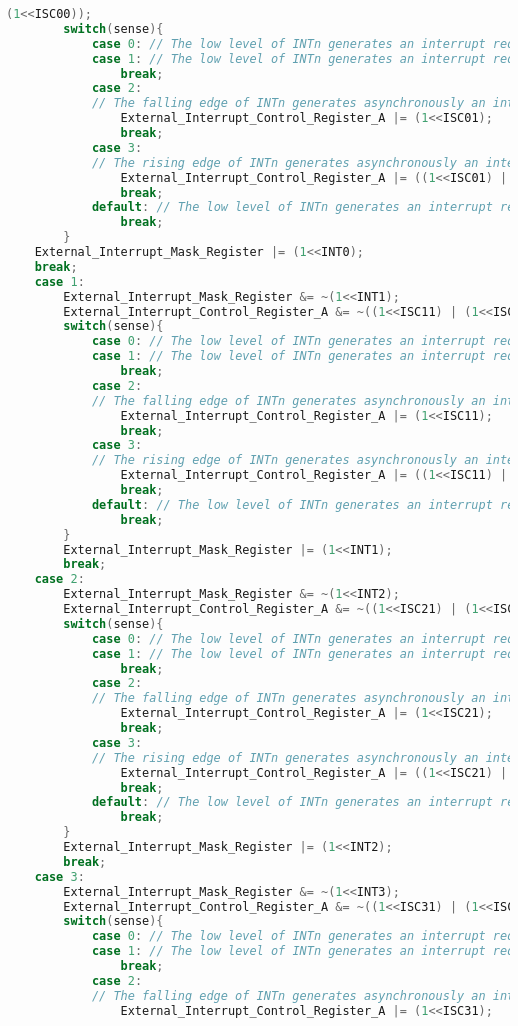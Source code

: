 \begin{lstlisting}[language=C, caption={atmega128interrupt.c}, label=atmega128interrupt-c, captionpos=b]
		(1<<ISC00));
		switch(sense){
			case 0: // The low level of INTn generates an interrupt request.
			case 1: // The low level of INTn generates an interrupt request.
				break;
			case 2: 
			// The falling edge of INTn generates asynchronously an interrupt request.
				External_Interrupt_Control_Register_A |= (1<<ISC01);
				break;
			case 3: 
			// The rising edge of INTn generates asynchronously an interrupt request.
				External_Interrupt_Control_Register_A |= ((1<<ISC01) | (1<<ISC00));
				break;
			default: // The low level of INTn generates an interrupt request.
				break;
		}
	External_Interrupt_Mask_Register |= (1<<INT0);
	break;
	case 1:
		External_Interrupt_Mask_Register &= ~(1<<INT1);
		External_Interrupt_Control_Register_A &= ~((1<<ISC11) | (1<<ISC10));
		switch(sense){
			case 0: // The low level of INTn generates an interrupt request.
			case 1: // The low level of INTn generates an interrupt request.
				break;
			case 2: 
			// The falling edge of INTn generates asynchronously an interrupt request.
				External_Interrupt_Control_Register_A |= (1<<ISC11);
				break;
			case 3: 
			// The rising edge of INTn generates asynchronously an interrupt request.
				External_Interrupt_Control_Register_A |= ((1<<ISC11) | (1<<ISC10));
				break;
			default: // The low level of INTn generates an interrupt request.
				break;
		}
		External_Interrupt_Mask_Register |= (1<<INT1);
		break;
	case 2:
		External_Interrupt_Mask_Register &= ~(1<<INT2);
		External_Interrupt_Control_Register_A &= ~((1<<ISC21) | (1<<ISC20));
		switch(sense){
			case 0: // The low level of INTn generates an interrupt request.
			case 1: // The low level of INTn generates an interrupt request.
				break;
			case 2: 
			// The falling edge of INTn generates asynchronously an interrupt request.
				External_Interrupt_Control_Register_A |= (1<<ISC21);
				break;
			case 3: 
			// The rising edge of INTn generates asynchronously an interrupt request.
				External_Interrupt_Control_Register_A |= ((1<<ISC21) | (1<<ISC20));
				break;
			default: // The low level of INTn generates an interrupt request.
				break;
		}
		External_Interrupt_Mask_Register |= (1<<INT2);
		break;
	case 3:
		External_Interrupt_Mask_Register &= ~(1<<INT3);
		External_Interrupt_Control_Register_A &= ~((1<<ISC31) | (1<<ISC30));
		switch(sense){
			case 0: // The low level of INTn generates an interrupt request.
			case 1: // The low level of INTn generates an interrupt request.
				break;
			case 2: 
			// The falling edge of INTn generates asynchronously an interrupt request.
				External_Interrupt_Control_Register_A |= (1<<ISC31);

\end{lstlisting}
